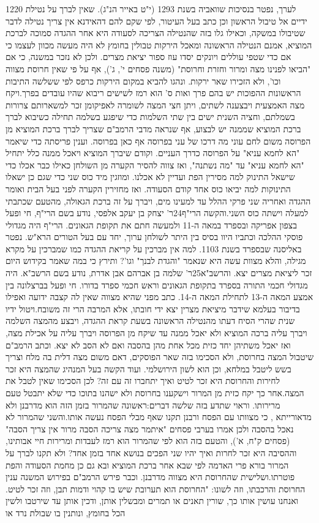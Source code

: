 \documentclass[12pt, openany]{book}
\begin{document}
1220 לערך, נפטר בנסיכות שוואביה בשנת 1293 (י"ט באייר הנ"ג). שאין לברך על נטילת ידיים אל טיבול הראשון וכן כתב בעל העיטור, לפי שקם להם דהאידנא אין צריך נטילה לדבר שטיבולו במשקה, וכאילו גלו בזה שהנטילה הצריכה לסעודה היא אחר ההגדה סמוכה לברכת המוציא, אמנם הנטילה הראשונה ומאכל הירקות טבולין בחומץ לא היה מעשה מכוון לעצמו כי אם כדי שטפי עוללים ויונקים יסדו עוז ספור יציאת מצרים. ולכן לא נזכר במשנה, כי אם "הביאו לפנינו מצה ומרור וחזרת וחרוסת" (משנה פסחים י', ג'), אף על פי שאין חרוסת מצווה וכו', ולא הזכירו שאר ירקות. ונהגו להביא במקום הירקות כרפס לפי ששלשה התיבות הראשונות ההפוכות יש בהם פרך ואות ס' הוא רמז לשישים ריבוא  שהיו עובדים בפרך.ויקח מצה האמצעית ויבצענה לשתים, ויתן חצי המצה לשומרה לאפיקומן זכר למשארותם צרורות בשמלתם, וחציה השנית ישים בין שתי השלמות כדי שיפגע בשלמה תחילה כשיבוא לברך ברכת המוציא שממנה יש לבצוע, אף שנראה מדבי הרמב"ם שצריך לברך ברכת המוציא מן הפרוסה משום לחם עוני מה דרכו של עני בפרוסה אף כאן בפרוסה. וענין פריסתה כדי שיאמר  "הא לחמא עניא" על הפרוסה כדרך העניים. וקודם שיברך המוציא ויאכל ממנה כלל יתחיל "הא לחמא עניא" עד "מה נשתנה", ואז צווה להסיר הקערה מן השולחן כאילו כבר אכלו כדי שישאל התינוק למה מסירין הפת ועדיין לא אכלנו. ומוזגין מיד כוס שני כדי שגם כן ישאלו התינוקות למה יביאו כוס אחד קודם הסעודה. ואז מחזירין הקערה לפני בעל הבית ואומר ההגדה ואחריה שני פרקי ההלל עד למעינו מים, ויברך על זה ברכת הגאולה, מהטעם שכתבתי למעלה וישתה כוס השני.והקשה הרי"ף24ר' יצחק בן יעקב אלפסי, נודע בשם הרי"ף, חי ופעל בצפון אפריקה ובספרד במאה ה-11 ולמעשה חתם את תקופת הגאונים. הרי"ף היה מגדולי פוסקי ההלכה וכתביו היוו בסיס בין היתר לשולחן ערוך, יחד עם בעל הטורים הרא"ש. נפטר באליסנה שבספרד בשנת 1103. למה אין מברכין על קריאת ההגדה כמו שמברכין על מקרא מגילה, והלא מצוות עשה היא שנאמר "והגדת לבנך" וגו'? ותירץ כי במה שאמר בקידוש היום זכר ליציאת מצרים יצא. והרשב"א25ר' שלמה בן אברהם אבן אדרת, נודע בשם הרשב"א. היה מגדולי חכמי התורה בספרד בתקופת הגאונים וראש חכמי ספרד בדורו. חי ופעל בברצלונה בין אמצע המאה ה-13 לתחילת המאה ה-14. כתב מפני שהיא מצווה שאין לה קצבה ידועה ואפילו בדיבור בעלמא שידבר מיציאת מצרין יצא ידי חובתו, אלא המרבה הרי זה משובח.ויטול ידיו שנית שהרי הסיח דעתו מהנטילה הראשונה בשעת קראת ההגדה, ויבצע מהמצה השלמה ויברך עליה ברכה המוציא ולא יאכל ממנה עד שיקח מן הפרוסה ויברך עליה על אכילת מצה, ואז יאכל משתיהן יחד כזית מכל אחת מהן בהסבה ואם לא הסב לא יצא. וכתב הרמב"ם שיטבול המצה בחרוסת, ולא הסכימו בזה שאר הפוסקים, דאם משום מצה דלית בה מלח וצריך בשש ליטבל במלחא, וכן הוא לשון הירושלמי. ועוד הקשה בעל המנהיג  שהמצה היא זכר לחירות והחרוסת היא זכר לטיט ואיך יתחברו זה עם זה? לכן הסכימו שאין לטבל את המצה.אחר כך יקח כזית מן המרור וישקענו בחרוסת ולא ישהנו בתוכו כדי שלא יתבטל טעם מרירותו. וראוי שתדע בזה שלשה דברים:ראשונה שהמרור בזמן הזה הוא מדרבנן ולא מדאורייתא , כי מצוותו עם הפסח ורבנן תקנו שאף מבלי הפסח נעשה אותו.והשני שהמרור לא נאכל בהסבה ולכן אמרו בערבי פסחים "איתמר מצה צריכה הסבה מרור אין צריך הסבה" (פסחים ק"ח, א'), והטעם בזה הוא לפי שהמרור הוא רמז לעבדות ומרירות חיי אבותינו, וההסיבה היא זכר לחרות ואיך יהיו שני הפכים בנושא אחד בזמן אחד? ולא תקנו לברך על המרור בורא פרי האדמה לפי שבא אחר ברכת המוציא ובא גם כן מחמת הסעודה והפת פוטרתו.ושלישית שהחרוסת היא מצווה מדרבנן. וכבר פירש הרמב"ם בפירוש המשנה ענין החרוסת והרכבתו, וזה לשונו: "החרוסת הוא תערובת שיש בו קהוי ודמות תבן, וזה זכר לטיט. ואנחנו עושין אותו כך, שורין תאנים או תמרים ומבשלין אותן, ודכין אותן עד שירטבו ולשין הכל בחומץ, ונותנין בו שבולת נרד או 
\end{document}
